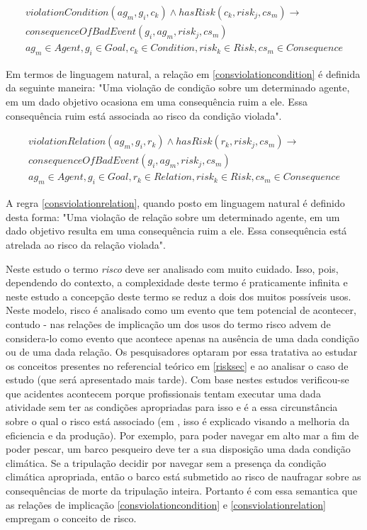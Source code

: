 \begin{eqnarray}\label{consviolationcondition}\nonumber
	violationCondition(ag_m,g_i,c_k)  \wedge hasRisk(c_k,risk_j,cs_m) \to \nonumber \\ 
	consequenceOfBadEvent(g_i,ag_m,risk_j,cs_m) \nonumber \\ 
    ag_m \in Agent, g_i \in Goal, c_k \in Condition, risk_k \in Risk, cs_m \in Consequence
\end{eqnarray}

Em termos de linguagem natural, a relação em \ref{consviolationcondition} é definida da seguinte maneira: "Uma violação de condição sobre um determinado 
agente, em um dado objetivo ocasiona em uma consequência ruim a ele. Essa consequência ruim está associada ao risco da condição violada". 

\begin{eqnarray}\label{consviolationrelation}\nonumber
	violationRelation(ag_m,g_i,r_k) \wedge hasRisk(r_k,risk_j,cs_m) \to \\ 
	consequenceOfBadEvent(g_i,ag_m,risk_j,cs_m) \nonumber \\ 
    ag_m \in Agent, g_i \in Goal, r_k \in Relation, risk_k \in Risk, cs_m \in Consequence 
\end{eqnarray}

A regra \ref{consviolationrelation}, quando posto em linguagem natural é definido desta forma: "Uma violação de relação sobre um determinado agente, 
em um dado objetivo resulta em uma consequência ruim a ele. Essa consequência está atrelada ao risco da relação violada". 

Neste estudo o termo \textit{risco} deve ser analisado com muito cuidado. Isso, pois, dependendo do contexto, a complexidade deste termo é praticamente 
infinita e neste estudo a concepção deste termo se reduz a dois dos muitos possíveis usos. Neste modelo, risco é analisado como um evento que tem potencial 
de acontecer, contudo - nas relações de implicação um dos usos do termo risco advem de considera-lo como evento que acontece apenas na ausência de uma dada condição ou de uma dada relação. 
Os pesquisadores optaram por essa tratativa ao estudar os conceitos presentes no referencial teórico em \ref{risksec} e ao analisar o caso de estudo (que será apresentado mais tarde). 
Com base nestes estudos verificou-se que acidentes acontecem porque profissionais tentam executar uma dada atividade sem ter as condições apropriadas 
para isso e é a essa circunstância sobre o qual o risco está associado (em \cite{safety}, isso é explicado visando a melhoria da eficiencia e da produção). 
Por exemplo, para poder navegar em alto mar a fim de poder pescar, um barco pesqueiro deve ter a sua disposição uma dada condição climática. Se a tripulação 
decidir por navegar sem a presença da condição climática apropriada, então o barco está submetido ao risco de naufragar sobre as consequências de morte da 
tripulação inteira. Portanto é com essa semantica que as relações de implicação \ref{consviolationcondition} e \ref{consviolationrelation} empregam o conceito de risco. 

